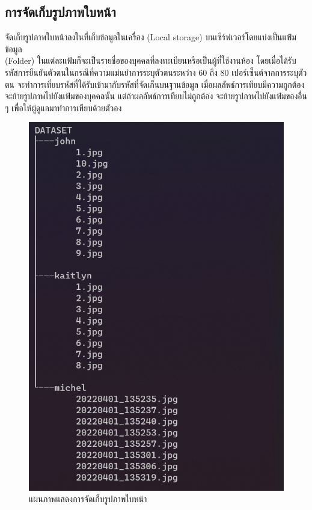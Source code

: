 \subsection{การจัดเก็บรูปภาพใบหน้า}
จัดเก็บรูปภาพใบหน้าลงในที่เก็บข้อมูลในเครื่อง (Local storage) บนเซิร์ฟเวอร์โดยแบ่งเป็นแฟ้มข้อมูล \\(Folder) 
ในแต่ละแฟ้มก็จะเป็นรายชื่อของบุคคลที่ลงทะเบียนหรือเป็นผู้ที่ใช้งานห้อง 
โดยเมื่อได้รับรหัสการยืนยันตัวตนในกรณีที่ความแม่นยำการระบุตัวตนระหว่าง 60 ถึง 80 เปอร์เซ็นต์จากการระบุตัวตน จะทำการเที่ยบรหัสที่ได้รับเข้ามากับรหัสที่จัดเก็นบนฐานข้อมูล 
เมื่อผลลัพธ์การเทียบมีความถูกต้องจะย้ายรูปภาพไปยังแฟ้มของบุคคลนั้น แต่ถ้าผลลัพธ์การเทียบไม่ถูกต้อง
จะย้ายรูปภาพไปยังแฟ้มของอื่น ๆ เพื่อให้ผู้ดูแลมาทำการเทียบด้วยตัวอง

\begin{figure}[ht]
  \begin{center}
    \includegraphics[scale=.5]{pic/dataset.png}
  \caption[แผนภาพแสดงการจัดเก็บรูปภาพใบหน้า]{แผนภาพแสดงการจัดเก็บรูปภาพใบหน้า}
  \end{center}
  \label{fig:folder}
\end{figure}


